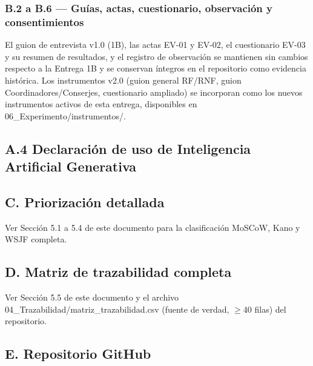 \subsubsection*{B.2 a B.6 --- Guías, actas, cuestionario, observación y consentimientos}


El guion de entrevista v1.0 (1B), las actas EV-01 y EV-02, el cuestionario EV-03 y su resumen de resultados, y el registro de observación se mantienen sin cambios respecto a la Entrega 1B y se conservan íntegros en el repositorio como evidencia histórica. Los instrumentos v2.0 (guion general RF/RNF, guion Coordinadores/Conserjes, cuestionario ampliado) se incorporan como los nuevos instrumentos activos de esta entrega, disponibles en 06\_Experimento/instrumentos/.


\subsection*{A.4 Declaración de uso de Inteligencia Artificial Generativa}


\subsection*{C. Priorización detallada}


Ver Sección 5.1 a 5.4 de este documento para la clasificación MoSCoW, Kano y WSJF completa.


\subsection*{D. Matriz de trazabilidad completa}


Ver Sección 5.5 de este documento y el archivo 04\_Trazabilidad/matriz\_trazabilidad.csv (fuente de verdad, $\geq$40 filas) del repositorio.


\subsection*{E. Repositorio GitHub}


